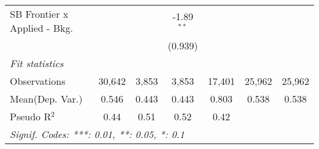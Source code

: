 \begin{tabular}{lcccccc}
   SB Frontier x Applied - Bkg.   &               &              & -1.89$^{**}$  &               &        &   \\   
                                  &               &              & (0.939)       &               &        &   \\   
   \midrule
   \emph{Fit statistics}\\
   Observations                   & 30,642        & 3,853        & 3,853         & 17,401        & 25,962 & 25,962\\  
Mean(Dep. Var.) & 0.546 & 0.443 & 0.443 & 0.803 & 0.538 & 0.538 \\
   Pseudo R$^2$                   & 0.44          & 0.51         & 0.52          & 0.42          &        & \\  
   \midrule \midrule
   \multicolumn{7}{l}{\emph{Signif. Codes: ***: 0.01, **: 0.05, *: 0.1}}\\
\end{tabular}
\par\endgroup

